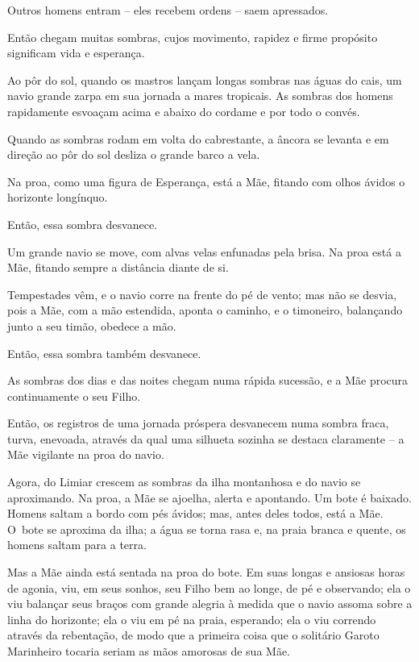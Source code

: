 Outros homens entram -- eles recebem ordens -- saem apressados.

\smallskip
Então chegam muitas sombras, cujos movimento, rapidez e firme propósito
significam vida e esperança.

\smallskip
Ao pôr do sol, quando os mastros lançam longas sombras nas águas do cais,
um navio grande zarpa em sua jornada a mares tropicais. As sombras dos
homens rapidamente esvoaçam acima e abaixo do cordame e por todo o
convés.

Quando as sombras rodam em volta do cabrestante, a âncora se levanta e
em direção ao pôr do sol desliza o grande barco a vela.

Na proa, como uma figura de Esperança, está a Mãe, fitando com olhos
ávidos o horizonte longínquo.

Então, essa sombra desvanece.

\smallskip
Um grande navio se move, com alvas velas enfunadas pela brisa. Na proa
está a Mãe, fitando sempre a distância diante de si.

Tempestades vêm, e o navio corre na frente do pé de vento; mas não se
desvia, pois a Mãe, com a mão estendida, aponta o caminho, e o
timoneiro, balançando junto a seu timão, obedece a mão.

Então, essa sombra também desvanece.

\smallskip
As sombras dos dias e das noites chegam numa rápida sucessão, e a Mãe
procura continuamente o seu Filho.

\smallskip
Então, os registros de uma jornada próspera desvanecem numa sombra
fraca, turva, enevoada, através da qual uma silhueta sozinha se destaca
claramente -- a Mãe vigilante na proa do navio.

\smallskip
Agora, do Limiar crescem as sombras da ilha montanhosa e do navio se
aproximando. Na proa, a Mãe se ajoelha, alerta e apontando. Um bote é
baixado. Homens saltam a bordo com pés ávidos; mas, antes deles todos,
está a Mãe. O~bote se aproxima da ilha; a água se torna rasa e, na praia
branca e quente, os homens saltam para a terra.

Mas a Mãe ainda está sentada na proa do bote. Em suas longas e ansiosas
horas de agonia, viu, em seus sonhos, seu Filho bem ao longe, de pé e
observando; ela o viu balançar seus braços com grande alegria à medida
que o navio assoma sobre a linha do horizonte; ela o viu em pé na praia,
esperando; ela o viu correndo através da rebentação, de modo que a
primeira coisa que o solitário Garoto Marinheiro tocaria seriam as mãos
amorosas de sua Mãe.

